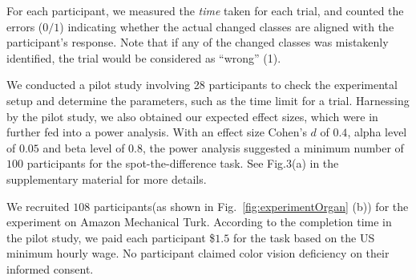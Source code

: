 {\vspace{.3em}
For each participant, we measured the \emph{time} taken for each trial, and counted the errors ($0/1$) indicating whether the actual changed classes are aligned with the participant's response. Note that if any of the changed classes was mistakenly identified, the trial would be considered as ``wrong'' (1).





\vspace{.3em}
We conducted a pilot study involving 28 participants to check the experimental setup and determine the parameters, such as the time limit for a trial.
Harnessing by the pilot study, we also obtained our expected effect sizes, which were in further fed into a power analysis. With an effect size Cohen's $d$ of $0.4$, alpha level of $0.05$ and beta level of $0.8$, the power analysis suggested a minimum number of $100$ participants for the spot-the-difference task. See Fig.3(a) in the supplementary material for more details.


\vspace{.3em}
We recruited $108$ participants(as shown in Fig.~\ref{fig:experimentOrgan} (b)) for the experiment on Amazon Mechanical Turk.
According to the completion time in the pilot study, we paid each participant \$$1.5$ for the task based on the US minimum hourly wage.
No participant claimed color vision deficiency on their informed consent.

}
